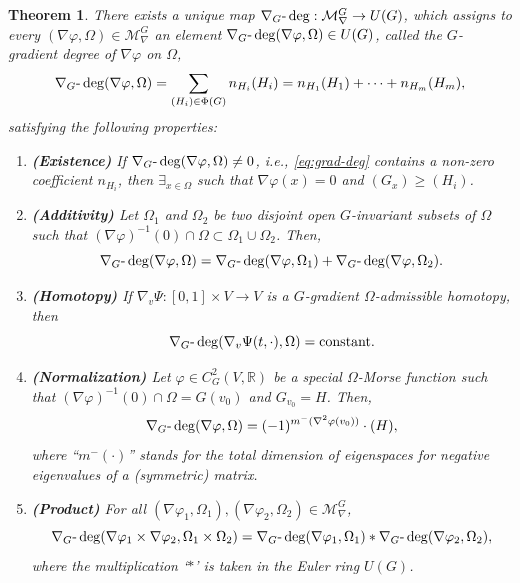 \documentclass{amsart}%
\newtheorem{theorem}{Theorem}
\begin{document}
\begin{theorem}
\label{thm:Ggrad-properties} There exists a unique map
$\nabla_{G}\mbox{\rm -}\deg:\mathcal{M}_{\nabla}^{G}\to U(G)$, which assigns
to every $(\nabla\varphi,\Omega)\in\mathcal{M}^{G}_{\nabla}$ an element
$\nabla_{G}\mbox{\rm -}\deg(\nabla\varphi,\Omega)\in U(G)$, called the
\textit{$G$-gradient degree} of $\nabla\varphi$ on $\Omega$,
\begin{equation}
\label{eq:grad-deg}\nabla_{G}\mbox{\rm -}\deg(\nabla\varphi,\Omega)=
\sum_{(H_{i})\in\Phi(G)}n_{H_{i}}(H_{i})= n_{H_{1}}(H_{1})+\dots
+n_{H_{m}}(H_{m}),
\end{equation}
satisfying the following properties:

\begin{enumerate}


\item \textrm{\textbf{(Existence)}} If $\nabla_{G}\mbox{\rm -}\deg
(\nabla\varphi,\Omega)\not =0$, i.e., \eqref{eq:grad-deg} contains a non-zero
coefficient $n_{H_{i}}$, then $\exists_{x\in\Omega}$ such that $\nabla
\varphi(x)=0$ and $(G_{x})\geq(H_{i})$.

\item \textrm{\textbf{(Additivity)}} Let $\Omega_{1}$ and $\Omega_{2}$ be two
disjoint open $G$-invariant subsets of $\Omega$ such that $(\nabla
\varphi)^{-1}(0)\cap\Omega\subset\Omega_{1}\cup\Omega_{2}$. Then,
\[
\nabla_{G}\mbox{\rm -}\deg(\nabla\varphi,\Omega)= \nabla_{G}\mbox{\rm -}\deg
(\nabla\varphi,\Omega_{1})+ \nabla_{G}\mbox{\rm -}\deg(\nabla\varphi
,\Omega_{2}).
\]


\item \textrm{\textbf{(Homotopy)}} If $\nabla_{v}\Psi:[0,1]\times V\to V$ is a
$G$-gradient $\Omega$-admissible homotopy, then
\[
\nabla_{G}\mbox{\rm -}\deg(\nabla_{v}\Psi(t,\cdot),\Omega)=\mathrm{constant}.
\]


\item \textrm{\textbf{(Normalization)}} Let $\varphi\in C^{2}_{G}
(V,\mathbb{R})$ be a special $\Omega$-Morse function such that $(\nabla
\varphi)^{-1}(0)\cap\Omega=G(v_{0})$ and $G_{v_{0}}=H$. Then,
\[
\nabla_{G}\mbox{\rm -}\deg(\nabla\varphi,\Omega)= (-1)^{{m}^{-}(\nabla
^{2}\varphi(v_{0}))}\cdot(H),
\]
where ``$m^{-}(\cdot)$'' stands for the total dimension of eigenspaces for
negative eigenvalues of a (symmetric) matrix.

\item \textrm{\textbf{(Product)}} For all $(\nabla\varphi_{1},\Omega
_{1}),(\nabla\varphi_{2},\Omega_{2})\in\mathcal{M}^{G}_{\nabla}$,
\[
\nabla_{G}\mbox{\rm -}\deg(\nabla\varphi_{1}\times\nabla\varphi_{2},
\Omega_{1}\times\Omega_{2})= \nabla_{G}\mbox{\rm -}\deg(\nabla\varphi
_{1},\Omega_{1})\ast\nabla_{G}\mbox{\rm -}\deg(\nabla\varphi_{2},\Omega_{2}),
\]
where the multiplication `$\ast$' is taken in the Euler ring $U(G)$.


\end{enumerate}
\end{theorem}
\end{document}
